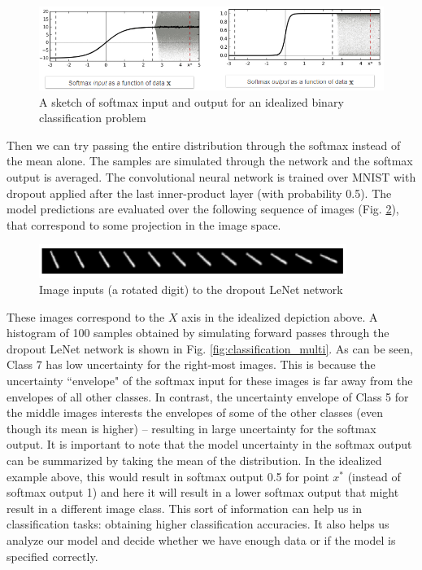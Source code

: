\begin{figure}[H]
    \centering
    \includegraphics[width=\textwidth]{figs/Classification_binary.png}
    \caption{A sketch of softmax input and output for an idealized binary classification problem}
    \label{fig:classification_binary}
\end{figure}

Then we can try passing the entire distribution through the softmax instead of the mean alone. The samples are simulated through the network and the softmax output is averaged. The convolutional neural network is trained over MNIST with dropout applied after the last inner-product layer (with probability 0.5). The model predictions are evaluated over the following sequence of images (Fig. \ref{fig:classification_input}), that correspond to some projection in the image space.

\begin{figure}[H]
    \centering
    \includegraphics[width=10cm]{figs/Classification_input.png}
    \caption{Image inputs (a rotated digit) to the dropout LeNet network}
    \label{fig:classification_input}
\end{figure}

These images correspond to the $X$ axis in the idealized depiction above. A histogram of 100 samples obtained by simulating forward passes through the dropout LeNet network is shown in Fig. \ref{fig:classification_multi}. As can be seen, Class 7 has low uncertainty for the right-most images. This is because the uncertainty ``envelope" of the softmax input for these images is far away from the envelopes of all other classes. In contrast, the uncertainty envelope of Class 5 for the middle images interests the envelopes of some of the other classes (even though its mean is higher) -- resulting in large uncertainty for the softmax output. It is important to note that the model uncertainty in the softmax output can be summarized by taking the mean of the distribution. In the idealized example above, this would result in softmax output 0.5 for point $x^*$ (instead of softmax output 1) and here it will result in a lower softmax output that might result in a different image class. This sort of information can help us in classification tasks: obtaining higher classification accuracies. It also helps us analyze our model and decide whether we have enough data or if the model is specified correctly.

